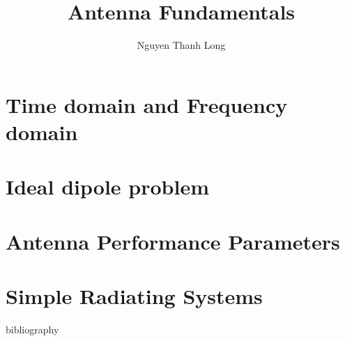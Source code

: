 \documentclass[t]{beamer}
\title{Antenna Fundamentals}
\author{Nguyen Thanh Long}
\institute{RF3i - Smart Sensor Lab}
\date{}
\begin{document}
\frame{\titlepage}

\section{Time domain and Frequency domain}



\section{Ideal dipole problem}









\section{Antenna Performance Parameters}





\section{Simple Radiating Systems}







\begin{frame}[allowframebreaks]{bibliography}

\printbibliography

\end{frame}
\end{document}
